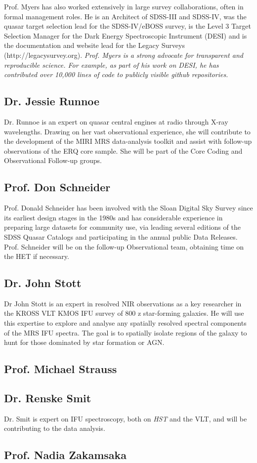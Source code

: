 \smallskip \smallskip
\noindent
Prof. Myers has also worked extensively in large survey
collaborations, often in formal management roles. He is an Architect
of SDSS-III and SDSS-IV, was the quasar target selection lead for the
SDSS-IV/eBOSS survey, is the Level 3 Target Selection Manager for the
Dark Energy Spectroscopic Instrument (DESI) and is the documentation
and website lead for the Legacy Surveys
(http://legacysurvey.org). {\it Prof. Myers is a strong advocate for
transparent and reproducible science. For example, as part of his work
on DESI, he has contributed over 10,000 lines of code to publicly
visible github repositories.}


\subsection*{Dr. Jessie Runnoe}
Dr. Runnoe is an expert on quasar central engines at radio through
X-ray wavelengths.  Drawing on her vast observational experience, she
will contribute to the development of the MIRI MRS data-analysis
toolkit and assist with follow-up observations of the ERQ core sample.
She will be part of the Core Coding and Observational Follow-up
groups.


\subsection*{Prof. Don Schneider}
Prof. Donald Schneider has been involved with the Sloan Digital Sky
Survey since its earliest design stages in the 1980s and has
considerable experience in preparing large datasets for community use,
via leading several editions of the SDSS Quasar Catalogs and
participating in the annual public Data Releases. Prof. Schneider will
be on the follow-up Observational team, obtaining time on the HET if
necessary.


\subsection*{Dr. John Stott}
Dr John Stott is an expert in resolved NIR observations as a key
researcher in the KROSS VLT KMOS IFU survey of 800 z
star-forming galaxies. He will use this expertise to explore and
analyse any spatially resolved spectral components of the MRS IFU
spectra. The goal is to spatially isolate regions of the galaxy to
hunt for those dominated by star formation or AGN.


\subsection*{Prof. Michael  Strauss}


\subsection*{Dr. Renske Smit}		
Dr. Smit is expert on IFU spectroscopy, both on {\it HST} and the VLT,
and will be contributing to the data analysis.

\subsection*{Prof. Nadia Zakamsaka} 



